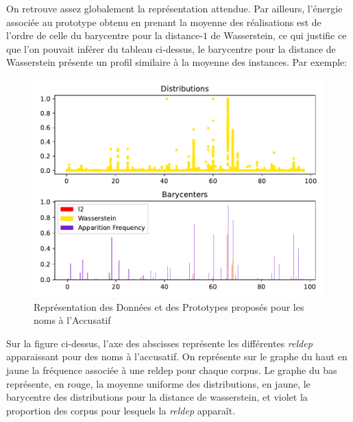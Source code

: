 \documentclass{cours}
\begin{document}
On retrouve assez globalement la représentation attendue.
Par ailleurs, l'énergie associée au prototype obtenu en prenant la moyenne des réalisations est de l'ordre de celle du barycentre pour la distance-$1$ de Wasserstein, ce qui justifie ce que l'on pouvait inférer du tableau ci-dessus, le barycentre pour la distance de Wasserstein présente un profil similaire à la moyenne des instances.
Par exemple:

\begin{figure}[H]
\centering
\includegraphics{Figures/Visualisations/Nouns_Wasserstein_Barycenter_Acc}
\caption{Représentation des Données et des Prototypes proposés pour les noms à l'Accusatif}
\end{figure}

Sur la figure ci-dessus, l'axe des abscisses représente les différentes \textit{reldep} apparaissant pour des noms à l'accusatif.
On représente sur le graphe du haut en jaune la fréquence associée à une reldep pour chaque corpus.
Le graphe du bas représente, en rouge, la moyenne uniforme des distributions, en jaune, le barycentre des distributions pour la distance de wasserstein, et violet la proportion des corpus pour lesquels la \textit{reldep} apparaît.

\newpage
\appendix




\appendix
\listoftables
\listoffigures
\end{document}
